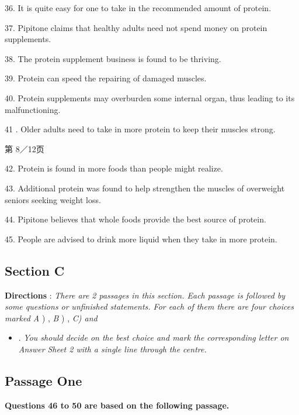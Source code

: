 \documentclass[UTF8,11pt]{ctexart}
\begin{document}
36. It is quite easy for one to take in the recommended amount of protein.


37. Pipitone claims that healthy adults need not spend money on protein supplements.


38. The protein supplement business is found to be thriving.


39. Protein can speed the repairing of damaged muscles.


40. Protein supplements may overburden some internal organ, thus leading to its malfunctioning.


41 . Older adults need to take in more protein to keep their muscles strong.


第 8／12页


42. Protein is found in more foods than people might realize.


43. Additional protein was found to help strengthen the muscles of overweight seniors seeking weight loss.


44. Pipitone believes that whole foods provide the best source of protein.


45. People are advised to drink more liquid when they take in more protein.


\subsection*{\textbf{Section C}}


\textbf{Directions }: \textit{There are 2 passages in this section. Each passage is followed by some questions or} \textit{unfinished statements. For each of them there are four choices marked A }) , \textit{B }) , \textit{C) and}


\begin{itemize}[leftmargin=2em,itemsep=.2em,topsep=.4em]\item[D.] . \textit{You should decide on the best choice and mark the corresponding letter on Answer} \textit{Sheet 2 with a single line through the centre.}
\end{itemize}

\subsection*{\textbf{Passage One}}


\textbf{Questions 46 to 50 are based on the following passage.}
\end{document}
